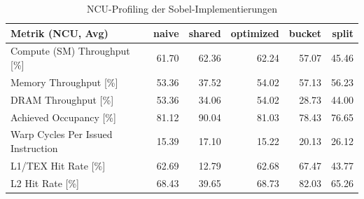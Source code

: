 \begin{table}[H]
    \begin{tabularx}{\textwidth}{lRRRRR}
\toprule
Metrik (NCU, Avg) & naive & shared & optimized & bucket & split \\
\midrule
Compute (SM) Throughput [\%]       & 61.70 & 62.36 & 62.24 & 57.07 & 45.46 \\
Memory Throughput [\%]             & 53.36 & 37.52 & 54.02 & 57.13 & 56.23 \\
DRAM Throughput [\%]               & 53.36 & 34.06 & 54.02 & 28.73 & 44.00 \\
Achieved Occupancy [\%]            & 81.12 & 90.04 & 81.03 & 78.43 & 76.65 \\
Warp Cycles Per Issued Instruction & 15.39 & 17.10 & 15.22 & 20.13 & 26.12 \\
L1/TEX Hit Rate [\%]               & 62.69 & 12.79 & 62.68 & 67.47 & 43.77 \\
L2 Hit Rate [\%]                   & 68.43 & 39.65 & 68.73 & 82.03 & 65.26 \\
\bottomrule
    \end{tabularx}
    \caption{NCU-Profiling der Sobel-Implementierungen}
\end{table}